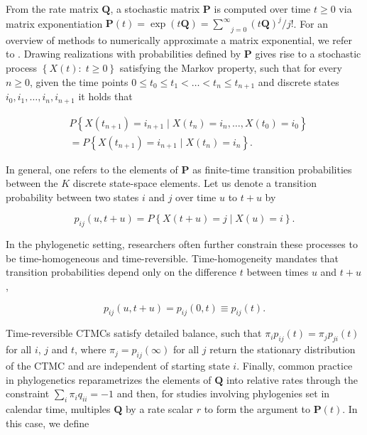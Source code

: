 From the rate matrix $\mathbf{Q}$, a stochastic matrix $\mathbf{P}$ is computed over time $t \geq 0$ via matrix exponentiation $\mathbf{P}(t)=
\exp(t\mathbf{Q})
=\underset{j=0}{\overset{\infty}{\sum}}
(t\mathbf{Q})^{j} / j!$. For an overview of methods to numerically approximate a matrix exponential, we refer to \citet{Moler1978}.
%
Drawing realizations with probabilities defined by $\mathbf{P}$ gives rise to a stochastic process $\left\{ X(t):\; t\geq0\right\}$ satisfying the Markov property, such that for every $n\geq 0$, given the time points $0\leq t_{0}\leq t_{1}<\ldots<t_{n}\leq t_{n+1}$ and discrete states $i_{0},i_{1}, \ldots, i_{n},i_{n+1}$ it holds that %

\begin{align}
& P\left\{ X(t_{n+1})=i_{n+1}\mid X(t_{n})=i_{n},\ldots, X(t_{0})=i_{0}\right\} \nonumber \\
&= P\left\{ X(t_{n+1})=i_{n+1}\mid X(t_{n})=i_{n}\right\}. 
\end{align}

In general, one refers to the elements of $\mathbf{P}$ as finite-time transition probabilities between the $K$ discrete state-space elements. Let us denote a transition probability between two states $i$ and $j$ over time $u$ to $t+u$ by

\begin{equation}
p_{ij}\left(u,t+u\right)=P\left\{ X(t+u)=j\mid X(u)=i\right\} .
\end{equation}

In the phylogenetic setting, researchers often further constrain these processes 
to be time-homogeneous and time-reversible. Time-homogeneity mandates that  transition probabilities depend only on the difference $t$ between times $u$ and $t + u$,

\begin{equation}
p_{ij}\left(u,t+u\right)= p_{ij}\left(0,t\right) \equiv p_{ij}\left(t\right) .
\end{equation}

Time-reversible CTMCs satisfy detailed balance, such that $\pi_{i}p_{ij}(t)=\pi_{j}p_{ji}(t)$ for all $i$, $j$ and $t$, where $\pi_j = p_{ij}(\infty)$ for all $j$ return the stationary distribution of the CTMC and are independent of starting state $i$.  
Finally, common practice in phylogenetics reparametrizes the elements of $\mathbf{Q}$ into relative rates through the constraint $\sum_i \pi_i q_{ii} = -1$ and then, for studies involving phylogenies set in calendar time, multiples $\mathbf{Q}$ by a rate scalar $r$ to form the argument to $\mathbf{P}(t)$. 
In this case, we define

